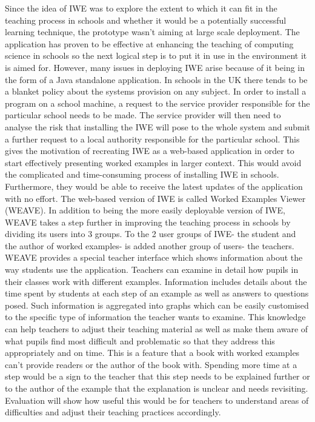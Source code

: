 Since the idea of IWE was to explore the extent to which it can fit in the teaching process in schools and whether it would be a potentially successful learning technique, the prototype wasn’t aiming at large scale deployment. The application has proven to be effective at enhancing the teaching of computing science in schools so the next logical step is to put it in use in the environment it is aimed for. However, many issues in deploying IWE arise because of it being in the form of a Java standalone application. In schools in the UK there tends to be a blanket policy about the systems provision on any subject. In order to install a program on a school machine, a request to the service provider responsible for the particular school needs to be made. The service provider will then need to analyse the risk that installing the IWE will pose to the whole system and submit a further request to a local authority responsible for the particular school. This gives the motivation of recreating IWE as a web-based application in order to start effectively presenting worked examples in larger context. This would avoid the complicated and time-consuming process of installing IWE in schools. Furthermore, they would be able to receive the latest updates of the application with no effort. The web-based version of IWE is called Worked Examples Viewer (WEAVE).
In addition to being the more easily deployable version of IWE, WEAVE takes a step further in improving the teaching process in schools by dividing its users into 3 groups. To the 2 user groups of IWE- the student and the author of worked examples- is added another group of users- the teachers. WEAVE provides a special teacher interface which shows information about the way students use the application. Teachers can examine in detail how pupils in their classes work with different examples. Information includes details about the time spent by students at each step of an example as well as answers to questions posed. Such information is aggregated into graphs which can be easily customised to the specific type of information the teacher wants to examine. This knowledge can help teachers to adjust their teaching material as well as make them aware of what pupils find most difficult and problematic so that they address this appropriately and on time. This is a feature that a book with worked examples can’t provide readers or the author of the book with. Spending more time at a step would be a sign to the teacher that this step needs to be explained further or to the author of the example that the explanation is unclear and needs revisiting. Evaluation will show how useful this would be for teachers to understand areas of difficulties and adjust their teaching practices accordingly.
